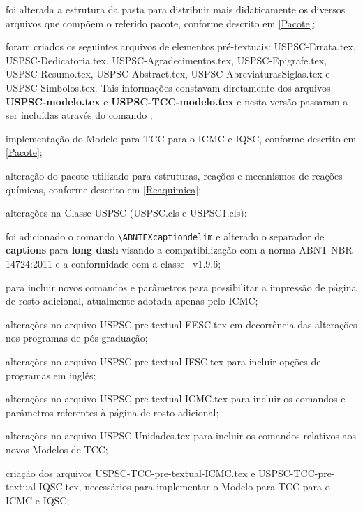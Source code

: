 \begin{alineas}	 
	\item foi alterada a estrutura da pasta para distribuir mais didaticamente os diversos arquivos que compõem o referido pacote, conforme descrito em \ref{Pacote}; 
	\item foram criados os seguintes arquivos de elementos pré-textuais: USPSC-Errata.tex, USPSC-Dedicatoria.tex, USPSC-Agradecimentos.tex, USPSC-Epigrafe.tex,\\
	USPSC-Resumo.tex, USPSC-Abstract.tex, USPSC-AbreviaturasSiglas.tex e USPSC-Simbolos.tex. 
	Tais informações constavam diretamente dos arquivos \textbf{USPSC-modelo.tex} e  \textbf{USPSC-TCC-modelo.tex} e nesta versão passaram a ser incluídas através do comando \verb++;
	\item implementação do Modelo para TCC para o ICMC e IQSC, conforme descrito em \ref{Pacote};
	\item alteração do pacote utilizado para estruturas, reações e mecanismos de reações químicas, conforme descrito em \ref{Reaquimica};
	\item alterações na Classe USPSC (USPSC.cls e USPSC1.cls):
		\begin{subalineas}
			\item foi adicionado o comando \verb+\ABNTEXcaptiondelim+ e alterado o separador de \textbf{captions} para \textbf{long dash} visando a compatibilização com a norma  ABNT NBR 14724:2011 e a conformidade com a classe \abnTeX\ v1.9.6;
			\item para incluir novos comandos e parâmetros para possibilitar a impressão de página de rosto adicional, atualmente adotada apenas pelo ICMC;
		\end{subalineas}
	\item alterações no arquivo USPSC-pre-textual-EESC.tex em decorrência das alterações nos programas de pós-graduação;
	\item alterações no arquivo USPSC-pre-textual-IFSC.tex para incluir opções de programas em inglês;
	\item alterações no arquivo USPSC-pre-textual-ICMC.tex para incluir os comandos e parâmetros referentes à página de rosto adicional;
	\item alterações no arquivo USPSC-Unidades.tex para incluir os comandos relativos aos novos Modelos de TCC;
	\item criação dos arquivos USPSC-TCC-pre-textual-ICMC.tex e USPSC-TCC-pre-textual-IQSC.tex, necessários para implementar o Modelo para TCC para o ICMC e IQSC;

\end{alineas}
